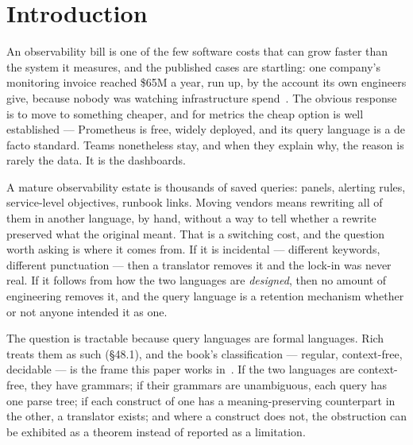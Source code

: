 
\section{Introduction}
\label{s:sec:intro}

An observability bill is one of the few software costs that can grow faster than the
system it measures, and the published cases are startling: one company's monitoring
invoice reached \$65M a year, run up, by the account its own engineers give, because
nobody was watching infrastructure spend~\citep{orosz2023}. The obvious response is to
move to something cheaper, and for metrics the cheap option is well established ---
Prometheus is free, widely deployed, and its query language is a de facto standard. Teams
nonetheless stay, and when they explain why, the reason is rarely the data. It is the
dashboards.

A mature observability estate is thousands of saved queries: panels, alerting rules,
service-level objectives, runbook links. Moving vendors means rewriting all of them in
another language, by hand, without a way to tell whether a rewrite preserved what the
original meant. That is a switching cost, and the question worth asking is where it comes
from. If it is incidental --- different keywords, different punctuation --- then a
translator removes it and the lock-in was never real. If it follows from how the two
languages are \emph{designed}, then no amount of engineering removes it, and the query
language is a retention mechanism whether or not anyone intended it as one.

The question is tractable because query languages are formal languages. Rich treats them
as such (§48.1), and the book's classification --- regular, context-free, decidable ---
is the frame this paper works in~\citep{rich2008}. If the two languages are context-free,
they have grammars; if their grammars are unambiguous, each query has one parse tree; if
each construct of one has a meaning-preserving counterpart in the other, a translator
exists; and where a construct does not, the obstruction can be exhibited as a theorem
instead of reported as a limitation.

